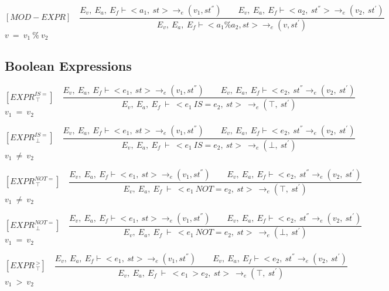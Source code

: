    	\[
   	[MOD-EXPR] \quad
   	\dfrac{E_v, \ E_a, \ E_f \vdash <a_1, \ st> \rightarrow_{e} (v_1, st^{''}) \qquad E_v, \ E_a, \ E_f \vdash <a_2, \ st^{''}> \rightarrow_e (v_2, \ st^{'})}{E_v, \ E_a, \ E_f \vdash <a_1 \% a_2, st> \rightarrow_{e} (v, st^{'})}
   	\]
   	\begin{math}
   	v \ = \ v_1 \ \% \ v_2
   	\end{math}   	

   	\subsection{Boolean Expressions}
   	\[
   	[EXPR^{IS=}_{\ \top}] \quad
   	\dfrac{E_v, \ E_a, \ E_f \vdash <e_1, \ st> \rightarrow_e (v_1, st^{''}) \qquad E_v, \ E_a, \ E_f \vdash <e_2, \ st^{''} \rightarrow_e (v_2, \ st^{'})}{E_v, \ E_a, \ E_f \ \vdash \ <e_1
   	\ IS= e_2, \ st> \ \rightarrow_e (\top, \ st^{'})}
   	\]
   	\begin{math}
   	v_1 \ = \ v_2 
   	\end{math}

   	\[
   	[EXPR^{IS=}_{\ \bot}] \quad
   	\dfrac{E_v, \ E_a, \ E_f \vdash <e_1, \ st> \rightarrow_e (v_1, st^{''}) \qquad E_v, \ E_a, \ E_f \vdash <e_2, \ st^{''} \rightarrow_e (v_2, \ st^{'})}{E_v, \ E_a, \ E_f \ \vdash \ <e_1
   	\ IS= e_2, \ st> \ \rightarrow_e (\bot, \ st^{'})}
   	\]
	\begin{math}
   	v_1 \ \not= \ v_2
   	\end{math}


   	\[
   	[EXPR^{NOT=}_{\ \top}] \quad
   	\dfrac{E_v, \ E_a, \ E_f \vdash <e_1, \ st> \rightarrow_e (v_1, st^{''}) \qquad E_v, \ E_a, \ E_f \vdash <e_2, \ st^{''} \rightarrow_e (v_2, \ st^{'})}{E_v, \ E_a, \ E_f \ \vdash \ <e_1 \ NOT= e_2, \ st> \ \rightarrow_e (\top, \ st^{'})}
   	\]
	\begin{math}
   	v_1 \ \not= \ v_2
   	\end{math}   	
   	

   	\[
   	[EXPR^{NOT=}_{\ \bot}] \quad
   	\dfrac{E_v, \ E_a, \ E_f \vdash <e_1, \ st> \rightarrow_e (v_1, st^{''}) \qquad E_v, \ E_a, \ E_f \vdash <e_2, \ st^{''} \rightarrow_e (v_2, \ st^{'})}{E_v, \ E_a, \ E_f \ \vdash \ <e_1 \ NOT= e_2, \ st> \ \rightarrow_e (\bot, \ st^{'})}
   	\]
	\begin{math}
   	v_1 \ = \ v_2
   	\end{math}   	
   	
   	
   	\[
   	[EXPR^{\ >}_{\ \top}] \quad
   	\dfrac{E_v, \ E_a, \ E_f \vdash <e_1, \ st> \rightarrow_e (v_1, st^{''}) \qquad E_v, \ E_a, \ E_f \vdash <e_2, \ st^{''} \rightarrow_e (v_2, \ st^{'})}{E_v, \ E_a, \ E_f \ \vdash \ <e_1 \ > e_2, \ st> \ \rightarrow_e (\top, \ st^{'})}
   	\]
	\begin{math}
   	v_1 \ > \ v_2
   	\end{math}   	
   	

